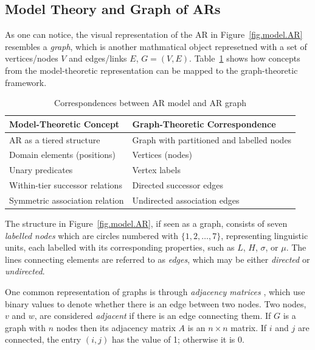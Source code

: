 \subsection{Model Theory and Graph of ARs}

As one can notice, the visual representation of the AR in Figure~\ref{fig.model.AR} 
resembles a \textit{graph}, which is another mathmatical object represetned 
with a set of vertices/nodes $V$ and edges/links $E$, \(G = (V, E)\). Table~\ref{tab:graph-model} shows how concepts from the model-theoretic representation can be mapped to the graph-theoretic framework.


\begin{table}[ht!]
    \centering
    \begin{tabular}{ll}
        \toprule
        \textbf{Model-Theoretic Concept}
        & \textbf{Graph-Theoretic Correspondence} \\
        \midrule
        AR as a tiered structure & Graph with  partitioned and labelled nodes \\
        Domain elements (positions) & Vertices (nodes) \\
        Unary predicates & Vertex labels \\
        Within-tier successor relations & Directed successor edges \\
        Symmetric association relation & Undirected association edges \\
        \bottomrule
    \end{tabular}
    \caption{Correspondences between AR model and AR graph}
    \label{tab:graph-model}
\end{table}


The structure in Figure~\ref{fig.model.AR}, if seen as a graph, consists
of seven \textit{labelled nodes} which are circles numbered with $\{1, 2,\dots,7\}$, 
representing linguistic units, each labelled with its corresponding properties, such
as $L$, $H$, $\sigma$, or $\mu$. 
The lines connecting elements are referred to as \textit{edges}, which 
may be either \textit{directed} or \textit{undirected}.

One common representation of graphs is through \textit{adjacency matrices}
\citep{west2001introduction,CLRS2022}, which use binary values to
denote whether there is an edge between two nodes. Two nodes, $v$ and
$w$, are considered \textit{adjacent} if there is an edge connecting
them. If $G$ is a graph with $n$ nodes 
then its adjacency matrix $A$ is an $n \times n$ matrix. If $i$ and 
$j$ are connected, the entry $(i, j)$ has the value of 1; otherwise it is
0. 

